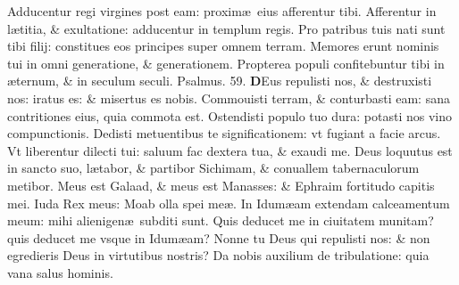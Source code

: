 \documentclass[a5paper,10pt]{book}
\def\ae{æ}
\begin{document}
\begin{multicols*}{2}
\newline \color{red} A\color{black}dducentur regi virgines post eam: proxim\ae \ eius afferentur tibi.
\newline \color{red} A\color{black}fferentur in l\ae titia, \& exultatione: adducentur in templum regis.
\newline \color{red} P\color{black}ro patribus tuis nati sunt tibi filij: constitues eos principes super omnem terram.
\newline \color{red} M\color{black}emores erunt nominis tui in omni generatione, \& generationem.
\newline \color{red} P\color{black}ropterea populi confitebuntur tibi in \ae ternum, \& in seculum seculi.
\newline \color{red} Psalmus. \hypertarget{ps59}{59.} \color{black}
\vspace{-.5em}
\lettrine[lines=2]{\bfseries \color{red} D}{}Eus repulisti nos, \& destruxisti nos: iratus es: \& misertus es nobis.
\newline \color{red} C\color{black}ommouisti terram, \& conturbasti eam: sana contritiones eius, quia commota est.
\newline \color{red} O\color{black}stendisti populo tuo dura: potasti nos vino compunctionis.
\newline \color{red} D\color{black}edisti metuentibus te significationem: vt fugiant a facie arcus.
\newline \color{red} V\color{black}t liberentur dilecti tui: saluum fac dextera tua, \& exaudi me.
\newline \color{red} D\color{black}eus loquutus est in sancto suo, l\ae tabor, \& partibor Sichimam, \& conuallem tabernaculorum metibor.
\newline \color{red} M\color{black}eus est Galaad, \& meus est Manasses: \& Ephraim fortitudo capitis mei.
\newline \color{red} I\color{black}uda Rex meus: Moab olla spei me\ae .
\newline \color{red} I\color{black}n Idum\ae am extendam calceamentum meum: mihi alienigen\ae \ subditi sunt.
\newline \color{red} Q\color{black}uis deducet me in ciuitatem munitam? quis deducet me vsque in Idum\ae am?
\newline \color{red} N\color{black}onne tu Deus qui repulisti nos: \& non egredieris Deus in virtutibus nostris?
\newline \color{red} D\color{black}a nobis auxilium de tribulatione: quia vana salus hominis.

\end{multicols*}
\end{document}
